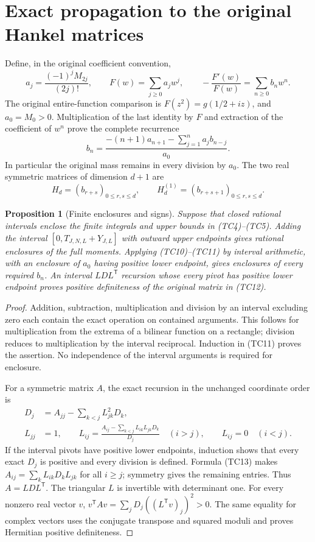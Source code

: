 \documentclass[11pt]{article}
\newtheorem{proposition}[theorem]{Proposition}
\begin{document}
\section{Exact propagation to the original Hankel matrices}
Define, in the original coefficient convention,
\[
a_j=\frac{(-1)^jM_{2j}}{(2j)!},\qquad
F(w)=\sum_{j\ge0}a_jw^j,\qquad
-\frac{F'(w)}{F(w)}=\sum_{n\ge0}b_nw^n.
\tag{TC10}
\]
The original entire-function comparison is
$F(z^2)=g(1/2+iz)$, and $a_0=M_0>0$. Multiplication of the
last identity by $F$ and extraction of the coefficient of $w^n$
prove the complete recurrence
\[
b_n=
\frac{-(n+1)a_{n+1}-\sum_{j=1}^na_jb_{n-j}}{a_0}.
\tag{TC11}
\]
In particular the original mass remains in every division by $a_0$.
The two real symmetric matrices of dimension $d+1$ are
\[
H_d=(b_{r+s})_{0\le r,s\le d},\qquad
H_d^{(1)}=(b_{r+s+1})_{0\le r,s\le d}.
\tag{TC12}
\]

\begin{proposition}[Finite enclosures and signs]
Suppose that closed rational intervals enclose the finite integrals
and upper bounds in (TC4)--(TC5). Adding the interval
$[0,T_{J,N,L}+Y_{J,L}]$ with outward upper endpoints gives rational
enclosures of the full moments. Applying (TC10)--(TC11) by interval
arithmetic, with an enclosure of $a_0$ having positive lower
endpoint, gives enclosures of every required $b_n$.
An interval $LDL^{\mathsf T}$ recursion whose every pivot has
positive lower endpoint proves positive definiteness of the
original matrix in (TC12).
\end{proposition}
\begin{proof}
Addition, subtraction, multiplication and division by an interval
excluding zero each contain the exact operation on contained
arguments. This follows for multiplication from the extrema of a
bilinear function on a rectangle; division reduces to multiplication
by the interval reciprocal. Induction in (TC11) proves the assertion.
No independence of the interval arguments is required for enclosure.

For a symmetric matrix $A$, the exact recursion in the unchanged
coordinate order is
\[
\begin{split}
D_j&=A_{jj}-\sum_{k<j}L_{jk}^2D_k,\\
L_{jj}&=1,\qquad
L_{ij}=\frac{A_{ij}-\sum_{k<j}L_{ik}L_{jk}D_k}{D_j}
\quad(i>j),\qquad L_{ij}=0\quad(i<j).
\end{split}
\tag{TC13}
\]
If the interval pivots have positive lower endpoints, induction
shows that every exact $D_j$ is positive and every division is
defined. Formula (TC13) makes $A_{ij}=\sum_kL_{ik}D_kL_{jk}$
for all $i\ge j$; symmetry gives the remaining entries.
Thus $A=LDL^{\mathsf T}$. The triangular $L$ is invertible with
determinant one. For every nonzero real vector $v$,
$v^{\mathsf T}Av=\sum_jD_j((L^{\mathsf T}v)_j)^2>0$.
The same equality for complex vectors uses the conjugate transpose
and squared moduli and proves Hermitian positive definiteness.
\end{proof}
\end{document}
